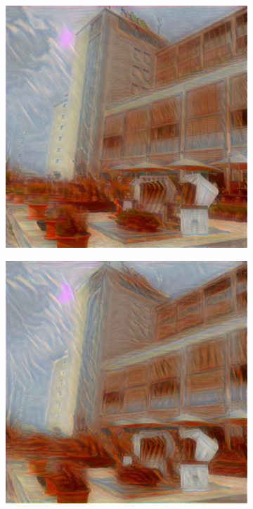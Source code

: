 \begin{figure}[H]
\begin{subfigure}[h]{0.15\textwidth}
    \end{subfigure}
    \begin{subfigure}[h]{0.15\textwidth}
        \centering
        \includegraphics[width=\textwidth]{resources/content/experiments/a__the_scream__768x768__style-weight_1e+07__tv-weight_0e+00.jpg}
    \end{subfigure}
    \begin{subfigure}[h]{0.15\textwidth}
        \centering
        \includegraphics[width=\textwidth]{resources/content/experiments/a__the_scream__768x768__style-weight_1e+08__tv-weight_0e+00.jpg}

\end{subfigure}
\end{figure}
